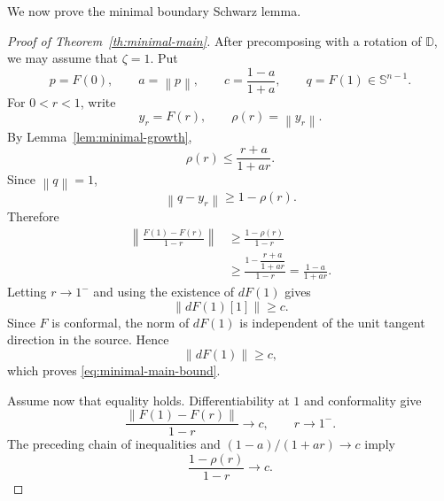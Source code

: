 \documentclass[11pt]{amsart}
\theoremstyle{definition}
\theoremstyle{remark}
\newcommand{\D}{\mathbb D}
\newcommand{\Sph}{\mathbb S}
\newcommand{\norm}[1]{\left\|#1\right\|}
\begin{document}
We now prove the minimal boundary Schwarz lemma.

\begin{proof}[Proof of Theorem~\ref{th:minimal-main}]
After precomposing with a rotation of \(\D\), we may assume that \(\zeta=1\). Put
\[
        p=F(0),
        \qquad
        a=\norm{p},
        \qquad
        c=\frac{1-a}{1+a},
        \qquad
        q=F(1)\in\Sph^{n-1}.
\]
For \(0<r<1\), write
\[
        y_r=F(r),
        \qquad
        \rho(r)=\norm{y_r}.
\]
By Lemma~\ref{lem:minimal-growth},
\begin{equation}\label{eq:rho-bound}
        \rho(r)\le \frac{r+a}{1+ar}.
\end{equation}
Since \(\norm{q}=1\),
\[
        \norm{q-y_r}\ge 1-\rho(r).
\]
Therefore
\[
\begin{aligned}
        \left\|\frac{F(1)-F(r)}{1-r}\right\|
        &\ge
        \frac{1-\rho(r)}{1-r} \\
        &\ge
        \frac{1-\dfrac{r+a}{1+ar}}{1-r}
        =
        \frac{1-a}{1+ar}.
\end{aligned}
\]
Letting \(r\to1^-\) and using the existence of \(dF(1)\) gives
\[
        \norm{dF(1)[1]}\ge c.
\]
Since \(F\) is conformal, the norm of \(dF(1)\) is independent of the unit tangent direction in the source. Hence
\[
        \norm{dF(1)}\ge c,
\]
which proves \eqref{eq:minimal-main-bound}.

Assume now that equality holds. Differentiability at \(1\) and conformality give
\begin{equation}\label{eq:boundary-asymptotic}
        \frac{\norm{F(1)-F(r)}}{1-r}\longrightarrow c,
        \qquad r\to1^-.
\end{equation}
The preceding chain of inequalities and \((1-a)/(1+ar)\to c\) imply
\begin{equation}\label{eq:rho-asymptotic}
        \frac{1-\rho(r)}{1-r}\longrightarrow c.
\end{equation}


\end{proof}
\end{document}
